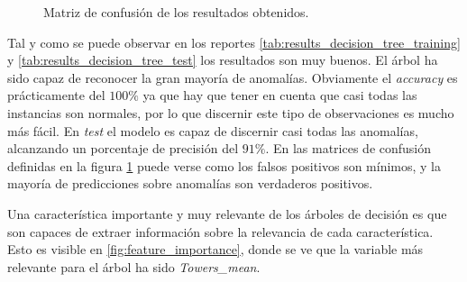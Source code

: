\documentclass[12pt,letterpaper]{article}
\begin{document}
\begin{figure}[htp]
    \centering
    \caption{Matriz de confusión de los resultados obtenidos.}
    \label{fig:cm_decision_tree}
\end{figure}

Tal y como se puede observar en los reportes \ref{tab:results_decision_tree_training} y \ref{tab:results_decision_tree_test} los resultados son muy buenos. El árbol ha sido capaz de reconocer la gran mayoría de anomalías. Obviamente el \textit{accuracy} es prácticamente del $100\%$ ya que hay que tener en cuenta que casi todas las instancias son normales, por lo que discernir este tipo de observaciones es mucho más fácil. En \textit{test} el modelo es capaz de discernir casi todas las anomalías, alcanzando un porcentaje de precisión del $91\%$. En las matrices de confusión definidas en la figura \ref{fig:cm_decision_tree} puede verse como los falsos positivos son mínimos, y la mayoría de predicciones sobre anomalías son verdaderos positivos.

Una característica importante y muy relevante de los árboles de decisión es que son capaces de extraer información sobre la relevancia de cada característica. Esto es visible en \ref{fig:feature_importance}, donde se ve que la variable más relevante para el árbol ha sido \textit{Towers\_mean}.
\end{document}
